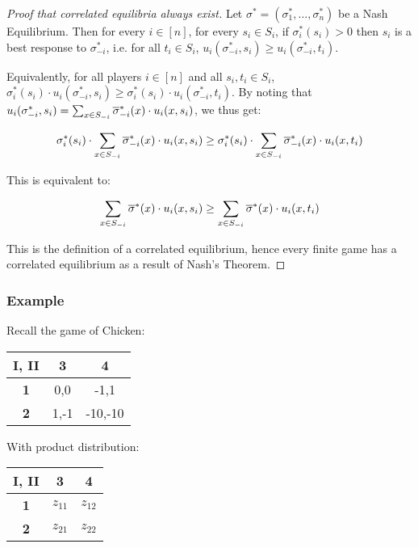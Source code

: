 \begin{proof}[Proof that correlated equilibria always exist]
	Let $\sigma^* = (\sigma^*_1, \ldots, \sigma^*_n)$ be a Nash Equilibrium.
	Then for every $i \in [n]$, for every $s_i \in S_i$, if $\sigma^*_i(s_i) >
	0$ then $s_i$ is a best response to $\sigma^*_{-i}$, i.e. for all $t_i \in
	S_i$, $u_i(\sigma^*_{-i}, s_i) \ge u_i(\sigma^*_{-i}, t_i)$.

	Equivalently, for all players $i \in [n]$ and all $s_i, t_i \in S_i$,
	$\sigma^*_i (s_i) \cdot u_i(\sigma^*_{-i}, s_i) \ge \sigma^*_i (s_i) \cdot
	u_i(\sigma^*_{-i}, t_i)$. By noting that $u_i(\sigma^*_{-i}, s_i) = \sum_{x
	\in S_{-i}} \overline{\sigma}^*_{-i} (x) \cdot u_i(x, s_i)$, we thus get:

	\begin{equation*}
		\sigma^*_i (s_i) \cdot \sum_{x \in S_{-i}} \overline{\sigma}^*_{-i} (x)
		\cdot u_i(x, s_i) \ge \sigma^*_i (s_i) \cdot \sum_{x \in S_{-i}}
		\overline{\sigma}^*_{-i} (x) \cdot u_i(x, t_i)
	\end{equation*}

	This is equivalent to:

	\begin{equation*}
		\sum_{x \in S_{-i}} \overline{\sigma}^* (x) \cdot u_i(x, s_i) \ge
		\sum_{x \in S_{-i}} \overline{\sigma}^* (x) \cdot u_i(x, t_i)
	\end{equation*}

	This is the definition of a correlated equilibrium, hence every finite game
	has a correlated equilibrium as a result of Nash's Theorem.
\end{proof}

\subsubsection{Example}

Recall the game of Chicken:

\begin{center}
	\begin{tabular}{|c|c|c|}
		\hline
		\textbf{I, II} & \textbf{3} & \textbf{4} \\ \hline
		\textbf{1}     & 0,0        & -1,1 \\ \hline
		\textbf{2}     & 1,-1       & -10,-10 \\ \hline
	\end{tabular}
\end{center}

With product distribution:

\begin{center}
	\begin{tabular}{|c|c|c|}
		\hline
		\textbf{I, II} & \textbf{3} & \textbf{4} \\ \hline
		\textbf{1}     & $z_{11}$   & $z_{12}$ \\ \hline
		\textbf{2}     & $z_{21}$   & $z_{22}$ \\ \hline
	\end{tabular}
\end{center}

